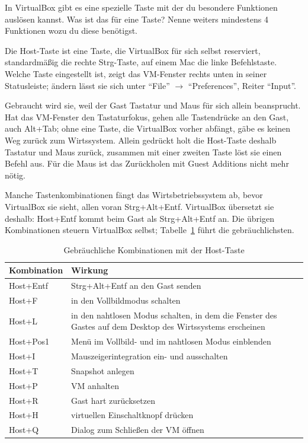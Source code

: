 \begin{aufgabe}
In VirtualBox gibt es eine spezielle Taste mit der du besondere Funktionen auslösen kannst. Was ist das für eine Taste? Nenne weiters mindestens 4 Funktionen wozu du diese benötigst.
\end{aufgabe}
\label{sec:hosttaste}

Die Host-Taste ist eine Taste, die VirtualBox für sich selbst reserviert, standardmäßig die rechte Strg-Taste, auf einem Mac die linke Befehlstaste. Welche Taste eingestellt ist, zeigt das VM-Fenster rechts unten in seiner Statusleiste; ändern lässt sie sich unter \enquote{File} $\rightarrow$ \enquote{Preferences}, Reiter \enquote{Input}.

Gebraucht wird sie, weil der Gast Tastatur und Maus für sich allein beansprucht. Hat das VM-Fenster den Tastaturfokus, gehen alle Tastendrücke an den Gast, auch Alt+Tab; ohne eine Taste, die VirtualBox vorher abfängt, gäbe es keinen Weg zurück zum Wirtssystem. Allein gedrückt holt die Host-Taste deshalb Tastatur und Maus zurück, zusammen mit einer zweiten Taste löst sie einen Befehl aus. Für die Maus ist das Zurückholen mit Guest Additions nicht mehr nötig.

Manche Tastenkombinationen fängt das Wirtsbetriebssystem ab, bevor VirtualBox sie sieht, allen voran Strg+Alt+Entf. VirtualBox übersetzt sie deshalb: Host+Entf kommt beim Gast als Strg+Alt+Entf an. Die übrigen Kombinationen steuern VirtualBox selbst; Tabelle~\ref{tab:hosttaste} führt die gebräuchlichsten.

\begin{table}[H]
\centering
\caption{Gebräuchliche Kombinationen mit der Host-Taste}
\label{tab:hosttaste}
\begin{tabularx}{\textwidth}{@{}lX@{}}
\toprule
\textbf{Kombination} & \textbf{Wirkung} \\
\midrule
Host+Entf & Strg+Alt+Entf an den Gast senden \\
Host+F & in den Vollbildmodus schalten \\
Host+L & in den nahtlosen Modus schalten, in dem die Fenster des Gastes auf dem Desktop des Wirtssystems erscheinen \\
Host+Pos1 & Menü im Vollbild- und im nahtlosen Modus einblenden \\
Host+I & Mauszeigerintegration ein- und ausschalten \\
\addlinespace
Host+T & Snapshot anlegen \\
Host+P & VM anhalten \\
Host+R & Gast hart zurücksetzen \\
Host+H & virtuellen Einschaltknopf drücken \\
Host+Q & Dialog zum Schließen der VM öffnen \\
\bottomrule
\end{tabularx}
\end{table}

